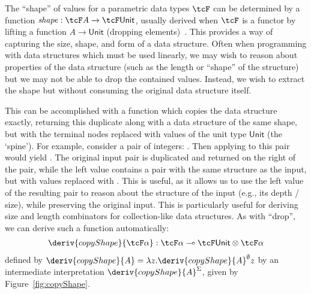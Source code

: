 The ``shape'' of values for a parametric data types $\tcF$ can be determined by
a function $\mathit{shape} : \tcF A \rightarrow \tcF \mathsf{Unit}$, usually
derived when $\tcF$ is a functor by lifting a function $A \rightarrow
\mathsf{Unit}$ (dropping elements)~\citep{jay1994shapely}. This provides a way
of capturing the size, shape, and form of a data structure. Often when
programming with data structures which must be used linearly, we may wish to
reason about properties of the data structure (such as the length or ``shape''
of the structure) but we may not be able to drop the contained values. Instead,
we wish to extract the shape but without consuming the original data structure
itself.

This can be accomplished with a function which copies the data structure
exactly, returning this duplicate along with a data structure of the same shape,
but with the terminal nodes replaced with values of the unit type
$\mathsf{Unit}$  (the `spine'). For example, consider a pair of integers:
. Then applying  to this pair would yield
. The original input pair is duplicated and returned
on the right of the pair, while the left value contains a pair with the same
structure as the input, but with values replaced with \granin{()}. This is
useful, as it allows us to use the left value of the resulting pair to reason
about the structure of the input (e.g., its depth / size), while preserving the
original input. This is particularly useful for deriving size and length
combinators for collection-like data structures.
\noindent
As with ``drop'', we can derive such a
function automatically:
\begin{align*}
\deriv{copyShape}{\tcF \alpha} : \tcF \alpha \multimap \tcF \mathsf{Unit} \otimes \tcF \alpha
\end{align*}
defined by
$\deriv{copyShape}{A} = \lambda z . \deriv{copyShape}{A}^\emptyset z$
by an intermediate interpretation $\deriv{copyShape}{A}^\Sigma$, given by Figure~\ref{fig:copyShape}.
%
